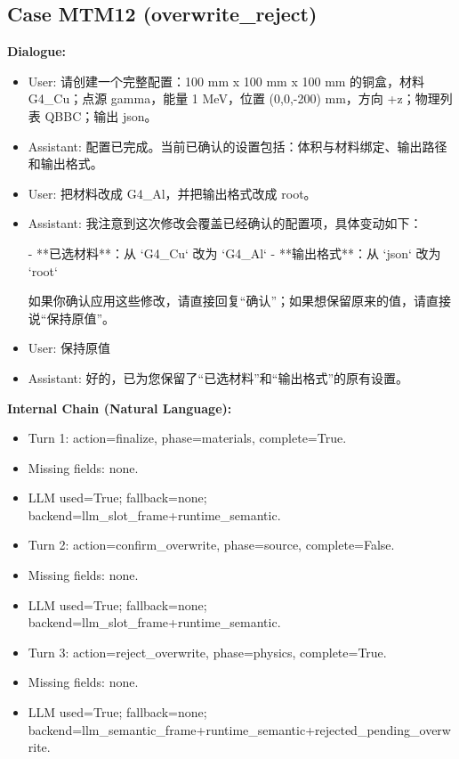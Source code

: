 \documentclass[11pt]{ctexart}
\begin{document}
\subsection{Case MTM12 (overwrite\_reject)}
\textbf{Dialogue:}
\begin{itemize}
\item User: 请创建一个完整配置：100 mm x 100 mm x 100 mm 的铜盒，材料 G4\_Cu；点源 gamma，能量 1 MeV，位置 (0,0,-200) mm，方向 +z；物理列表 QBBC；输出 json。
\item Assistant: 配置已完成。当前已确认的设置包括：体积与材料绑定、输出路径和输出格式。
\item User: 把材料改成 G4\_Al，并把输出格式改成 root。
\item Assistant: 我注意到这次修改会覆盖已经确认的配置项，具体变动如下：

- **已选材料**：从 `G4\_Cu` 改为 `G4\_Al`
- **输出格式**：从 `json` 改为 `root`

如果你确认应用这些修改，请直接回复“确认”；如果想保留原来的值，请直接说“保持原值”。
\item User: 保持原值
\item Assistant: 好的，已为您保留了“已选材料”和“输出格式”的原有设置。
\end{itemize}
\textbf{Internal Chain (Natural Language):}
\begin{itemize}
\item Turn 1: action=finalize, phase=materials, complete=True.
\item Missing fields: none.
\item LLM used=True; fallback=none; backend=llm\_slot\_frame+runtime\_semantic.
\item Turn 2: action=confirm\_overwrite, phase=source, complete=False.
\item Missing fields: none.
\item LLM used=True; fallback=none; backend=llm\_slot\_frame+runtime\_semantic.
\item Turn 3: action=reject\_overwrite, phase=physics, complete=True.
\item Missing fields: none.
\item LLM used=True; fallback=none; backend=llm\_semantic\_frame+runtime\_semantic+rejected\_pending\_overwrite.
\end{itemize}
\end{document}
